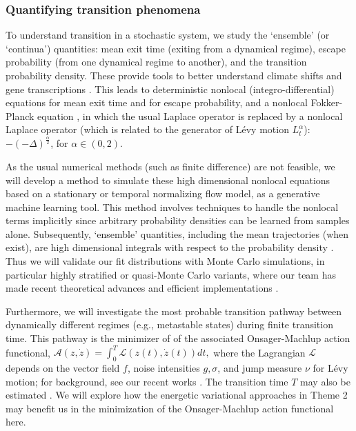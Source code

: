 \documentclass[11pt]{NSFamsart}
\begin{document}
\subsubsection*{Quantifying transition phenomena}
To understand transition   in    a stochastic system, we  study the     `ensemble' (or `continua') quantities: mean exit time (exiting from a dynamical regime),   escape probability (from one dynamical regime to another), and  the transition  probability density. These provide tools to better understand  climate shifts \cite{ZhengYY2020} and  gene transcriptions \cite{ChenWuDuan}. 
This leads to deterministic  nonlocal (integro-differential) equations for mean exit time and for escape probability, and a nonlocal Fokker-Planck equation \cite{DuanBook2015},
in which the usual Laplace operator is replaced
by a nonlocal Laplace operator (which is related to the generator of L\'evy motion $L_t^\alpha$):  $-(-\Delta)^{\frac{\alpha}2  }$, for $\alpha \in (0, 2)$.
 
 
As the usual numerical methods (such as finite difference) are not feasible, we will develop a method to simulate these high dimensional nonlocal equations based on a stationary or temporal normalizing flow model, as a  generative machine learning tool.    This method involves techniques to handle the nonlocal terms implicitly since arbitrary probability densities can be learned from samples alone. Subsequently, `ensemble' quantities, including the mean trajectories (when exist), are high dimensional integrals with respect to the probability density \cite{DuanBook2015}.  Thus we will validate our fit distributions with Monte Carlo simulations, in particular highly stratified or quasi-Monte Carlo variants, where our team has made recent theoretical advances \cite{Hic17a, HicEtal17a} and efficient implementations \cite{QMCPy2020a}. 

Furthermore, we will investigate the most probable transition pathway between dynamically different regimes (e.g., metastable states) during finite transition time. This pathway is the minimizer of  
of the associated Onsager-Machlup action functional, $\mathcal{A}(z, \dot z) = \int_0^T \mathcal{L}(z(t), \dot z(t)) dt,$ where the Lagrangian  $\mathcal{L}$ depends on the vector field $f$, noise intensities $g, \sigma$, and  jump measure $\nu$ for L\'evy motion; for background, see   our recent works \cite{ChaoDuanOM,HuangYF}. The   transition time $T$ may also be estimated \cite{HuangYF2020}. We will explore how the energetic variational approaches in Theme 2 may benefit us in the minimization of the Onsager-Machlup action functional here. 
\end{document}
